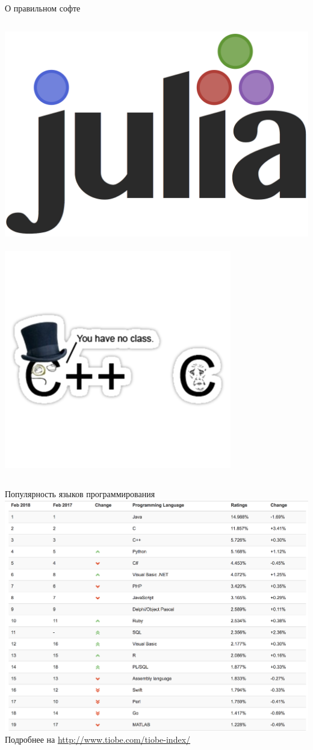 \documentclass[aspectratio=169,newPxFont]{beamer}
\begin{document}
\begin{frame}{О правильном софте}
\begin{columns}
\begin{column}{.48\linewidth}
\centering
\includegraphics[width=0.5\linewidth]{julia-logo.png}
\mbox{ } \\
\includegraphics[width=0.7\linewidth]{c-vs-cpp.png}
\end{column}
\end{columns}
\end{frame}


\begin{frame}{Популярность языков программирования}
\centering \includegraphics[width=0.55\linewidth]{langpop2018.png}\\
\vspace{0.2cm}
Подробнее на {\url{http://www.tiobe.com/tiobe-index/}}
\end{frame}
\end{document}
